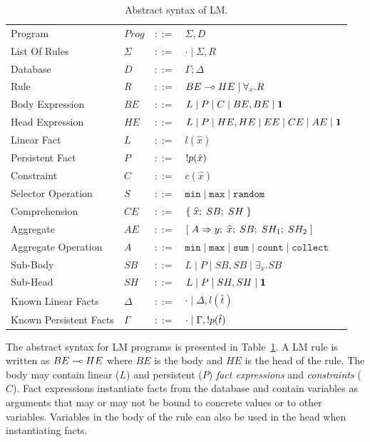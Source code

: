 \begin{table}[h]
\centering
\begin{tabular}{ l l c l }
  Program & $Prog$ & $::=$ & $\Sigma, D$ \\
  List Of Rules & $\Sigma$ & $::=$ & $\cdot \; | \; \Sigma, R$\\
  Database & $D$ & $::=$ & $\Gamma; \Delta$ \\
  Rule & $R$ & $::=$ & $BE \multimap HE \; | \; \forall_{x}. R$ \\
  Body Expression & $BE$ & $::=$ & $L \; | \; P \; | \; C \; | \; BE, BE \; | \; \mathbf{1}$\\
  Head Expression & $HE$ & $::=$ & $L \; | \; P \; | \; HE, HE \; | \; EE \; |
  \; CE \; | \; AE \; | \; \mathbf{1}$\\
  
  Linear Fact & $L$ & $::=$ & $l(\hat{x})$\\
  Persistent Fact & $P$ & $::=$ & ${!} p(\hat{x})$\\
  Constraint & $C$ & $::=$ & $c(\hat{x})$ \\
  Selector Operation & $S$ & $::=$ & $\mathtt{min} \; | \; \mathtt{max} \; | \; \mathtt{random}$\\
  
  Comprehension & $CE$ & $::=$ & $\{ \; \widehat{x}; \; SB; \; SH \; \}$ \\

  Aggregate & $AE$ & $::=$ & $[\; A \Rightarrow y; \; \widehat{x}; \; SB; \; SH_1; \; SH_2 \;]$ \\
  Aggregate Operation & $A$ & $::=$ & $\mathtt{min} \; | \; \mathtt{max} \; | \;
\mathtt{sum} \; | \; \mathtt{count} \; | \; \mathtt{collect}$ \\
  
  Sub-Body & $SB$ & $::=$ & $L \; | \; P \; | \; SB, SB \; | \; \exists_{x}. SB$\\
  Sub-Head & $SH$ & $::=$ & $L \; | \; P \; | \; SH, SH \; | \; \mathbf{1}$\\
  
  Known Linear Facts & $\Delta$ & $::=$ & $\cdot \; | \; \Delta, l(\hat{t})$ \\
  Known Persistent Facts & $\Gamma$ & $::=$ & $\cdot \; | \; \Gamma, {!} p(\hat{t})$ \\
\end{tabular}
\caption{Abstract syntax of LM.}\label{tbl:ast}
\end{table}

The abstract syntax for LM programs is presented in Table~\ref{tbl:ast}.  A LM
rule is written as $BE \multimap HE$ where $BE$ is the body and $HE$ is the head of
the rule. The body may contain linear ($L$) and persistent ($P$) \emph{fact
   expressions} and \emph{constraints} ($C$). Fact expressions instantiate facts from
   the database and contain variables as arguments that may or may not be bound
   to concrete values or to other variables.
   Variables in the body of the rule can also be used in the
   head when instantiating facts.
  
